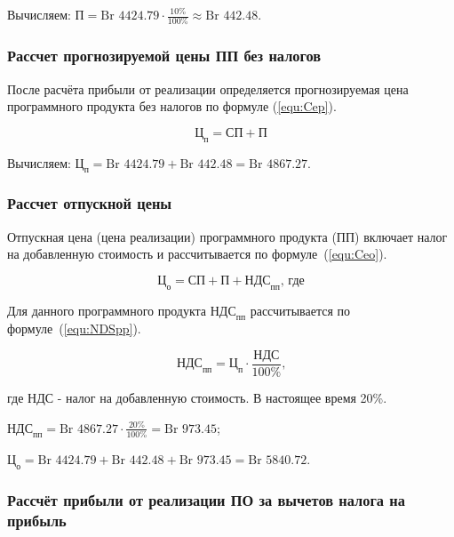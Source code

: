 Вычисляем: $\text{П} = \text{Br } 4424.79 \cdot \frac{ 10\% }{ 100\% } \approx \text{Br } 442.48$.

\subsubsection*{Рассчет прогнозируемой цены ПП без налогов}

После расчёта прибыли от реализации определяется прогнозируемая цена программного продукта без налогов
по формуле (\ref{equ:Cep}).

\begin{equation}
    \label{equ:Cep}
    \text{Ц}_\text{п} = \text{СП} + \text{П}
\end{equation}

Вычисляем: $\text{Ц}_\text{п} = \text{Br } 4424.79 + \text{Br } 442.48 = \text{Br } 4867.27$.

\subsubsection*{Рассчет отпускной цены}

Отпускная цена (цена реализации) программного продукта (ПП) включает налог на добавленную стоимость и рассчитывается по формуле~(\ref{equ:Ceo}).

\begin{equation}
    \label{equ:Ceo}
    \text{Ц}_\text{о} = \text{СП} + \text{П} + \text{НДС}_\text{пп} \text{, где}
\end{equation}

Для данного программного продукта $\text{НДС}_\text{пп}$ рассчитывается по формуле~(\ref{equ:NDSpp}).

\begin{equation}
    \label{equ:NDSpp}
    \text{НДС}_\text{пп} = \text{Ц}_\text{п} \cdot \frac{ \text{НДС} }{ 100\% } \text{,}
\end{equation}

где $\text{НДС}$ - налог на добавленную стоимость.
В настоящее время 20\%.


$\text{НДС}_\text{пп} = \text{Br } 4867.27 \cdot \frac{ 20\% }{ 100\% } = \text{Br } 973.45$;

$\text{Ц}_\text{о} = \text{Br } 4424.79 + \text{Br } 442.48 + \text{Br } 973.45 = \text{Br } 5840.72$.

\subsubsection*{Рассчёт прибыли от реализации ПО за вычетов налога на прибыль}


